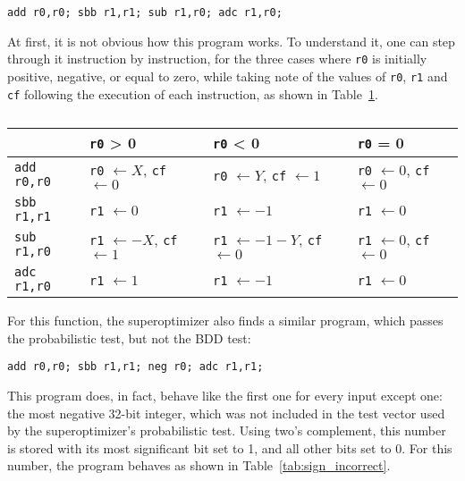\documentclass[a4paper,11pt]{kth-mag}
\renewcommand{\gets}{\leftarrow}
\begin{document}
\begin{verbatim}
add r0,r0; sbb r1,r1; sub r1,r0; adc r1,r0;
\end{verbatim}

At first, it is not obvious how this program works.
To understand it, one can step through it instruction by instruction,
for the three cases where \verb|r0| is initially positive, negative, or equal to zero,
while taking note of the values of \verb|r0|, \verb|r1| and \verb|cf| following the execution of each instruction,
as shown in Table~\ref{tab:sign_correct}.

\begin{table}
\centering
\begin{tabular}{l|lll}
& \verb|r0| > 0
& \verb|r0| < 0
& \verb|r0| = 0 \\
\hline
\verb|add r0,r0|
& \verb|r0| $\gets X$, \verb|cf| $\gets 0$ %
& \verb|r0| $\gets Y$, \verb|cf| $\gets 1$
& \verb|r0| $\gets 0$, \verb|cf| $\gets 0$ \\
\verb|sbb r1,r1|
& \verb|r1| $\gets 0$
& \verb|r1| $\gets -1$
& \verb|r1| $\gets 0$ \\
\verb|sub r1,r0|
& \verb|r1| $\gets -X$, \verb|cf| $\gets 1$
& \verb|r1| $\gets -1-Y$, \verb|cf| $\gets 0$ %
& \verb|r1| $\gets 0$, \verb|cf| $\gets 0$ \\
\verb|adc r1,r0|
& \verb|r1| $\gets 1$
& \verb|r1| $\gets -1$
& \verb|r1| $\gets 0$ \\
\end{tabular}
\caption{}
\label{tab:sign_correct}
\end{table}

For this function, the superoptimizer also finds a similar program, which passes the probabilistic test, but not the BDD test:

\begin{verbatim}
add r0,r0; sbb r1,r1; neg r0; adc r1,r1;
\end{verbatim}

This program does, in fact, behave like the first one for every input except one: the most negative 32-bit integer, which was not included in the test vector used by the superoptimizer's probabilistic test.
Using two's complement, this number is stored with its most significant bit set to 1, and all other bits set to 0.
For this number, the program behaves as shown in Table~\ref{tab:sign_incorrect}.
\end{document}
